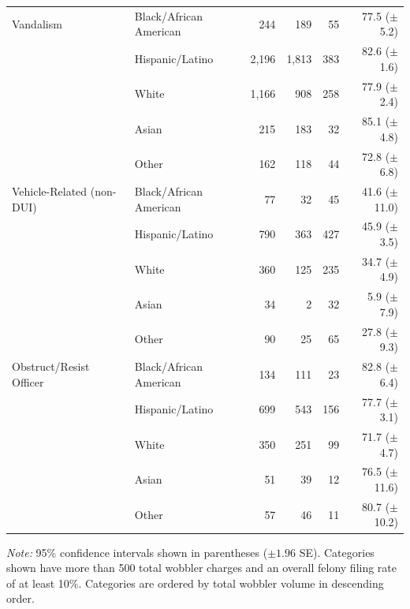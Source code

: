 \begin{table}
\begin{tabular}{llrrrr}
\addlinespace
\midrule
Vandalism & Black/African American & 244 & 189 & 55 & 77.5 ({\scriptsize $\pm$5.2}) \\
 & Hispanic/Latino & 2,196 & 1,813 & 383 & 82.6 ({\scriptsize $\pm$1.6}) \\
 & White & 1,166 & 908 & 258 & 77.9 ({\scriptsize $\pm$2.4}) \\
 & Asian & 215 & 183 & 32 & 85.1 ({\scriptsize $\pm$4.8}) \\
 & Other & 162 & 118 & 44 & 72.8 ({\scriptsize $\pm$6.8}) \\
\addlinespace
\midrule
Vehicle-Related (non-DUI) & Black/African American & 77 & 32 & 45 & 41.6 ({\scriptsize $\pm$11.0}) \\
 & Hispanic/Latino & 790 & 363 & 427 & 45.9 ({\scriptsize $\pm$3.5}) \\
 & White & 360 & 125 & 235 & 34.7 ({\scriptsize $\pm$4.9}) \\
 & Asian & 34 & 2 & 32 & 5.9 ({\scriptsize $\pm$7.9}) \\
 & Other & 90 & 25 & 65 & 27.8 ({\scriptsize $\pm$9.3}) \\
\addlinespace
\midrule
Obstruct/Resist Officer & Black/African American & 134 & 111 & 23 & 82.8 ({\scriptsize $\pm$6.4}) \\
 & Hispanic/Latino & 699 & 543 & 156 & 77.7 ({\scriptsize $\pm$3.1}) \\
 & White & 350 & 251 & 99 & 71.7 ({\scriptsize $\pm$4.7}) \\
 & Asian & 51 & 39 & 12 & 76.5 ({\scriptsize $\pm$11.6}) \\
 & Other & 57 & 46 & 11 & 80.7 ({\scriptsize $\pm$10.2}) \\
\bottomrule
\end{tabular}
    \smallskip
    \parbox{\textwidth}{\footnotesize \textit{Note:} 95\% confidence intervals shown in parentheses ($\pm 1.96$ SE). Categories shown have more than 500 total wobbler charges and an overall felony filing rate of at least 10\%. Categories are ordered by total wobbler volume in descending order.}
\end{table}